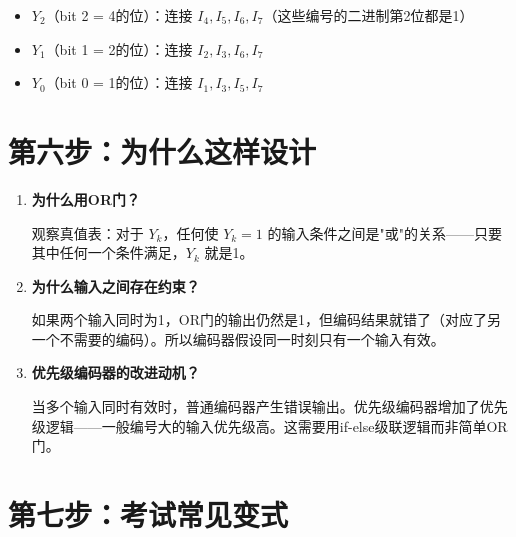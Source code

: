 \begin{itemize}
  \item $Y_2$（bit 2 = 4的位）：连接 $I_4, I_5, I_6, I_7$（这些编号的二进制第2位都是1）
  \item $Y_1$（bit 1 = 2的位）：连接 $I_2, I_3, I_6, I_7$
  \item $Y_0$（bit 0 = 1的位）：连接 $I_1, I_3, I_5, I_7$
\end{itemize}

\section{第六步：为什么这样设计}

\begin{enumerate}
  \item \textbf{为什么用OR门？}

  观察真值表：对于 $Y_k$，任何使 $Y_k=1$ 的输入条件之间是"或"的关系——只要其中任何一个条件满足，$Y_k$ 就是1。

  \item \textbf{为什么输入之间存在约束？}

  如果两个输入同时为1，OR门的输出仍然是1，但编码结果就错了（对应了另一个不需要的编码）。所以编码器假设同一时刻只有一个输入有效。

  \item \textbf{优先级编码器的改进动机？}

  当多个输入同时有效时，普通编码器产生错误输出。优先级编码器增加了优先级逻辑——一般编号大的输入优先级高。这需要用if-else级联逻辑而非简单OR门。
\end{enumerate}

\section{第七步：考试常见变式}

